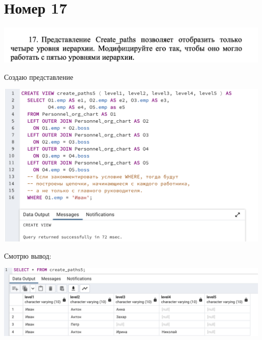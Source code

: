 \documentclass[a4paper,12pt]{article}
\begin{document}
\section*{Номер 17}
\begin{flushleft}
\includegraphics[scale=0.5]{17_1.png}
\end{flushleft}
Создаю представление
\begin{flushleft}
\includegraphics[scale=0.5]{17_2.png}
\end{flushleft}
Смотрю вывод:
\begin{flushleft}
\includegraphics[scale=0.5]{17_3.png}
\end{flushleft}
\clearpage
\end{document}
